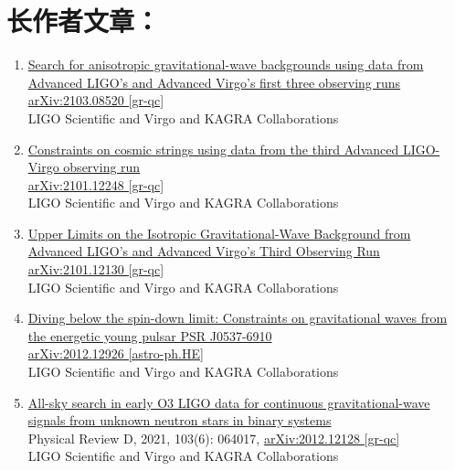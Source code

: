 \section*{长作者文章：}
\begin{enumerate}
    
    \item \href{https://arxiv.org/abs/2103.08520}{Search for anisotropic gravitational-wave backgrounds using data from Advanced LIGO's and Advanced Virgo's first three observing runs}\\ \href{https://arxiv.org/abs/2103.08520}{arXiv:2103.08520 [gr-qc]}\\
    LIGO Scientific and Virgo and KAGRA Collaborations
    
    \item \href{https://arxiv.org/abs/2101.12248}{Constraints on cosmic strings using data from the third Advanced LIGO-Virgo observing run}\\ \href{https://arxiv.org/abs/2101.12248}{arXiv:2101.12248 [gr-qc]}\\
    LIGO Scientific and Virgo and KAGRA Collaborations

    \item \href{https://arxiv.org/abs/2101.12130}{Upper Limits on the Isotropic Gravitational-Wave Background from Advanced LIGO's and Advanced Virgo's Third Observing Run}\\ \href{https://arxiv.org/abs/2101.12130}{arXiv:2101.12130 [gr-qc]}\\
    LIGO Scientific and Virgo and KAGRA Collaborations    
    
    \item \href{https://arxiv.org/abs/2012.12926}{Diving below the spin-down limit: Constraints on gravitational waves from the energetic young pulsar PSR J0537-6910}\\ \href{https://arxiv.org/abs/2012.12926}{arXiv:2012.12926 [astro-ph.HE]}\\
    LIGO Scientific and Virgo and KAGRA Collaborations      
    
    \item \href{https://journals.aps.org/prd/abstract/10.1103/PhysRevD.103.064017}{All-sky search in early O3 LIGO data for continuous gravitational-wave signals from unknown neutron stars in binary systems}\\     
    Physical Review D, 2021, 103(6): 064017, \href{https://arxiv.org/abs/2012.12128}{arXiv:2012.12128 [gr-qc]}\\
    LIGO Scientific and Virgo and KAGRA Collaborations    
\end{enumerate}


